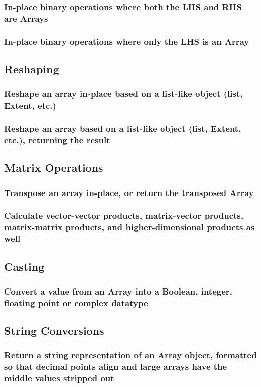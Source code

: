 \documentclass[10pt,a4paper]{report}
\begin{document}
			\subsubsection{In-place binary operations where both the LHS and RHS are Arrays}
			\subsubsection{In-place binary operations where only the LHS is an Array}
		\pagebreak
		\subsection{Reshaping}
			\subsubsection{Reshape an array in-place based on a list-like object (list, Extent, etc.)}
			\subsubsection{Reshape an array based on a list-like object (list, Extent, etc.), returning the result}
		\subsection{Matrix Operations}
			\subsubsection{Transpose an array in-place, or return the transposed Array}
			\subsubsection{Calculate vector-vector products, matrix-vector products, matrix-matrix products, and higher-dimensional products as well}
		\subsection{Casting}
			\subsubsection{Convert a value from an Array into a Boolean, integer, floating point or complex datatype}
		\subsection{String Conversions}
			\subsubsection{Return a string representation of an Array object, formatted so that decimal points align and large arrays have the middle values stripped out}
\end{document}
